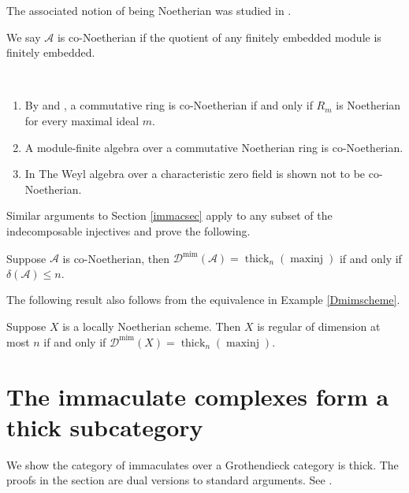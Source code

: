 \documentclass[12pt,oneside]{amsart}
\DeclareMathOperator{\thick}{thick}
\DeclareMathOperator{\minj}{maxinj}
\DeclareMathOperator{\mimmac}{mim}
\begin{document}
The associated notion of being Noetherian was studied in \cite{Jan69}. 


\begin{defn}
We say $\mathcal{A}$ is co-Noetherian if the quotient of any finitely embedded module is finitely embedded. 
\end{defn}


\begin{ex} \
\begin{enumerate}
\item By \cite[Theorem 1]{Jan69} and \cite[Theorem 2]{Vam68}, a commutative ring is co-Noetherian if and only if $R_m$ is Noetherian for every maximal ideal $m$. 

\item \cite[Corollary 2.3]{HIR00} A module-finite algebra over a commutative Noetherian ring is co-Noetherian.

\item In \cite[Example 2.1]{HIR00} The Weyl algebra over a characteristic zero field is shown not to be co-Noetherian. 
\end{enumerate}
\end{ex}

Similar arguments to Section \ref{immacsec} apply to any subset of the indecomposable injectives and prove the following.

\begin{theorem} 
Suppose $\mathcal{A}$ is co-Noetherian, then $\mathcal{D}^{\mimmac}(\mathcal{A}) = \thick_n(\minj)$ if and only if $\delta(\mathcal{A}) \leq n$.  
\end{theorem}

The following result also follows from the equivalence in Example \ref{Dmimscheme}.

\begin{theorem}
Suppose $X$ is a locally Noetherian scheme. Then $X$ is regular of dimension at most $n$ if and only if $\mathcal{D}^{\mimmac}(X) = \thick_n(\minj)$.
\end{theorem}





\appendix




\section{The immaculate complexes form a thick subcategory} \label{thickimmac}

We show the category of immaculates over a Grothendieck category is thick. The proofs in the section are dual versions to standard arguments. See \cite[Tag 064N]{stacks-project}.
\end{document}
